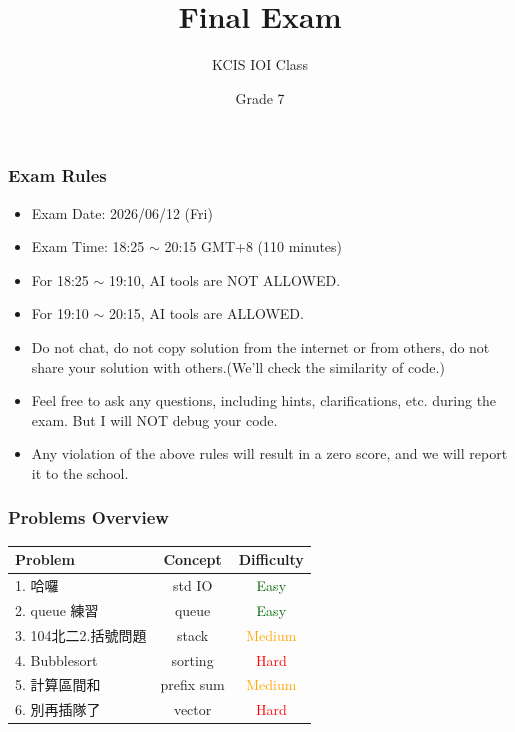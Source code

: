 \documentclass[xcolor=dvipsnames]{beamer}
\title{Final Exam}
\author{KCIS IOI Class}
\date{Grade 7}
\begin{document}
	\begin{frame}
		\titlepage
	\end{frame}

    \begin{frame}
        \frametitle{Exam Rules}
        \begin{itemize}
            \item Exam Date: 2026/06/12 (Fri)
            \item Exam Time: 18:25 $\sim$ 20:15 GMT+8 (110 minutes)
            \item For 18:25 $\sim$ 19:10, AI tools are NOT ALLOWED.
            \item For 19:10 $\sim$ 20:15, AI tools are ALLOWED.
            \item Do not chat, do not copy solution from the internet or from others, do not share your solution with others.(We'll check the similarity of code.)
            \item Feel free to ask any questions, including hints, clarifications, etc. during the exam. But I will NOT debug your code.
            \item Any violation of the above rules will result in a zero score, and we will report it to the school.
        \end{itemize}
    \end{frame}

    \begin{frame}
        \frametitle{Problems Overview}
        \centering
        \begin{tabular}{lcc}
            \toprule
            Problem & Concept & Difficulty \\
            \midrule
            1. 哈囉 & std IO& \textcolor{DarkGreen}{Easy}\\
            2. queue 練習 & queue & \textcolor{DarkGreen}{Easy}\\
            3. 104北二2.括號問題  & stack & \textcolor{orange}{Medium} \\
            4. Bubblesort & sorting & \textcolor{red}{Hard} \\
            5. 計算區間和 & prefix sum & \textcolor{orange}{Medium} \\
            6. 別再插隊了 & vector & \textcolor{red}{Hard} \\
            \bottomrule
        \end{tabular}
    \end{frame}
\end{document}

